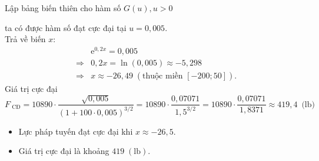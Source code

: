 \begin{bt}
{		Lập bảng biến thiên cho  hàm số $G(u), u > 0$
		\begin{center}
		\end{center}
		ta có được hàm số đạt cực  đại tại $u=0{,}005$.\\
		 Trả về biến $x$: \allowdisplaybreaks
		\begin{eqnarray*}
			 &&\mathrm{e}^{0,2x}=0{,}005\\
			&\Rightarrow& 0{,}2x=\ln(0{,}005)  \approx-5{,}298\\
			&\Rightarrow&  x \approx-26{,}49\;\left(\text{thuộc miền }[-200;50]\right).
		\end{eqnarray*}
		Giá trị cực đại $F_{\text{ CĐ}}=10890\cdot\dfrac{\sqrt{0{,}005}}{(1+100\cdot 0{,}005)^{3/2}}=10890\cdot\dfrac{0{,}07071}{1{,}5^{3/2}}=10890\cdot\dfrac{0{,}07071}{1{,}8371} \approx 419{,}4\,\text{  (lb)}$
		\begin{itemize}
			\item Lực pháp tuyến đạt cực đại khi $x \approx-26{,}5$. 
			\item Giá trị cực đại là khoảng $419\;(\mathrm{lb})$. 
		\end{itemize}
	} 
\end{bt}

